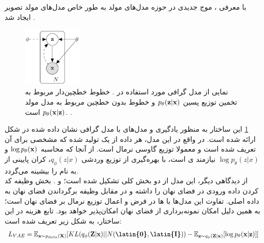 \subsection{\vae{}}
با معرفی
،
موج جدیدی در حوزه مدل‌های مولد به طور خاص مدل‌های مولد تصویر ایجاد شد \cite{vae}.
\begin{figure}[H]
	\centering
	\includegraphics[width=0.25\textwidth]{images/vae-pgm.png}
	\caption{
		نمایی از مدل گرافی مورد استفاده در \vae{}. خطوط خطچین‌‌دار مربوط به تخمین توزیع پسین $p_\theta({\bf z}|{\bf x})$ و خطوط بدون خطچین مربوط به مدل مولد
		$p_\theta({\bf x}|{\bf z})$
		است.
		\cite{vae_text}.}
	\label{fig:vae-pgm}
\end{figure}
این ساختار به منظور یادگیری و  مدل‌های با مدل گرافی نشان داده شده در شکل ‎\ref{fig:vae-pgm}‎ ارائه شده است. در واقع در این مدل، هر داده از یک   تولید شده که \priordist{} مشخصی برای آن تعریف شده است و معمولا توزیع گاوسی نرمال است. از آنجا که محاسبه $\log p_\theta({\bf x})$ و $\log p_\theta (z|x)$ نیازمند \inference ی  است، با بهره‌گیری از  توزیع وردشی $q_\phi(z|x)$، کران پایینی از \likelihood{} به نام  را بیشینه می‌گردد.\\
از دیدگاهی دیگر، این مدل از دو بخش کلی تشکیل شده است؛  و . بخش \encoder{} وظیفه کد کردن داده ورودی در فضای نهان را داشته و در مقابل \decoder{} وظیفه برگرداندن فضای نهان به داده اصلی. تفاوت این مدل‌ها با ها در فرض و اعمال توزیع نرمال بر فضای نهان است؛ به همین دلیل امکان نمونه‌برداری از فضای نهان امکان‌پذیر خواهد بود. تابع هزینه در این ساختار، به شکل زیر تعریف شده است:
\begin{equation} \label{eq:vae}
	\begin{split}
		L_{VAE} = \expected_{\bff{x} \sim p_{data}(\bff{X})} [KL(q_\phi(\bff{Z}|\bff{x}) || N(\textbf{\latin{0}},\textbf{\latin{I}}))- \expected_{\bff{z} \sim q_\phi(\bff{Z}|\bff{x})}[\log p_\theta(\bff{x}|\bff{z})]]
	\end{split}
\end{equation}
